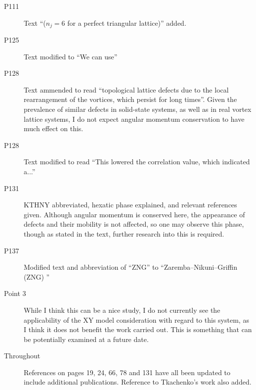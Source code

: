 \documentclass[paper=a4, fontsize=12pt]{scrartcl}
\begin{document}
\begin{description}
    \item [P111] Text ``($n_j=6$ for a perfect triangular lattice)'' added.
    \item [P125] Text modified to ``We can use''
    \item [P128] Text ammended to read ``topological lattice defects due to the local rearrangement of the vortices, which persist for long times''. Given the prevalence of similar defects in solid-state systems, as well as in real vortex lattice systems, I do not expect angular momentum conservation to have much effect on this.
    \item [P128] Text modified to read ``This lowered the correlation value, which indicated a...''
    \item [P131] KTHNY abbreviated, hexatic phase explained, and relevant references given. Although angular momentum is conserved here, the appearance of defects and their mobility is not affected, so one may observe this phase, though as stated in the text, further research into this is required.
    \item [P137] Modified text and abbreviation of ``ZNG'' to ``Zaremba--Nikuni--Griffin (ZNG) ''

    \item [Point 3] While I think this can be a nice study, I do not currently see the applicability of the XY model consideration with regard to this system, as I think it does not benefit the work carried out. This is something that can be potentially examined at a future date.

    \item [Throughout] References on pages 19, 24, 66, 78 and 131 have all been updated to include additional publications. Reference to Tkachenko's work also added.
\end{description}
\end{document}
